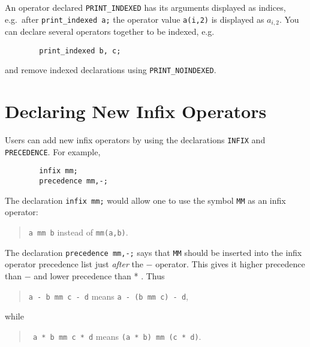 \hypertarget{command:PRINT_INDEXED}{}\hypertarget{command:PRINT_NOINDEXED}{}

An operator declared
\texttt{PRINT\_INDEXED} has
its arguments displayed as indices, e.g.\ after
\texttt{print\_indexed~a;} the operator value \texttt{a(i,2)} is
displayed as \(a_{i,2}\).  You can declare several operators together
to be indexed, e.g.
\begin{verbatim}
        print_indexed b, c;
\end{verbatim}
and remove indexed declarations using
\texttt{PRINT\_NOINDEXED}.


\section{Declaring New Infix Operators}
\hypertarget{command:INFIX}{}
\hypertarget{command:PRECEDENCE}{}

Users can add new infix operators by using the declarations
\texttt{INFIX} and \texttt{PRECEDENCE}.
For example,
\begin{verbatim}
        infix mm;
        precedence mm,-;
\end{verbatim}
The declaration \texttt{infix mm;} would allow one to use the symbol
\texttt{MM} as an infix operator:
\begin{quote}
\hspace{0.2in} \texttt{a mm b} \hspace{0.3in} instead of \hspace{0.3in}
\texttt{mm(a,b)}.
\end{quote}

The declaration \texttt{precedence mm,-;} says that \texttt{MM} should be
inserted into the infix operator precedence list just {\em after\/}
the $-$ operator.  This gives it higher precedence than $-$ and lower
precedence than * .  Thus

\begin{quote}
\hspace{0.2in}\texttt{a - b mm c - d}\hspace{.3in} means \hspace{.3in}
\texttt{a - (b mm c) - d},
\end{quote}
while
\begin{quote}
\hspace{0.2in}\texttt{  a * b mm c * d}\hspace{.3in} means \hspace{.3in}
\texttt{(a * b) mm (c * d)}.
\end{quote}

